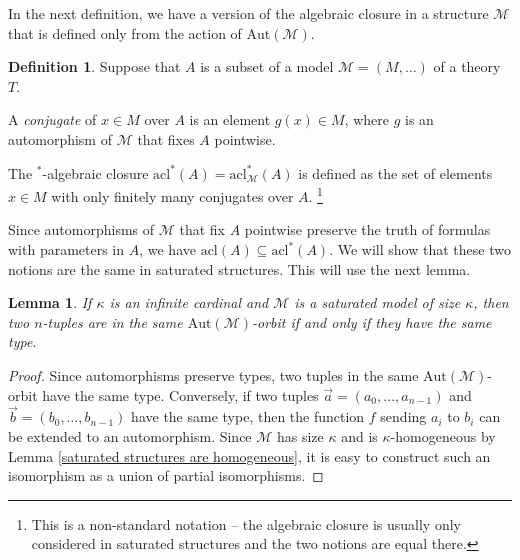 \documentclass[10pt]{amsart}
\newcommand{\MM}{\mathcal{M}}
\newcommand{\acl}{\mathrm{acl}}
\newcommand{\tp}{\mathrm{tp}}
\newcommand{\Aut}{\mathrm{Aut}}
\newtheorem{lemma}[theorem]{Lemma}
\theoremstyle{definition}
\newtheorem{definition}[theorem]{Definition}
\theoremstyle{remark}
\newenvironment{enumerate-(a)}{\begin{enumerate}[label={\upshape (\alph*)}, leftmargin=2pc]}{\end{enumerate}}
\begin{document}
In the next definition, we have a version of the algebraic closure in a structure $\MM$ that is defined only from the action of $\Aut(\MM)$. 

\begin{definition} 
Suppose that $A$ is a subset of a model $\MM=(M,\dots)$ of a theory $T$. 
\begin{enumerate-(a)} 
\item 
A \emph{conjugate} of $x\in M$ over $A$ is an element $g(x)\in M$, where $g$ is an automorphism of $\MM$ that fixes $A$ pointwise. 
\item 
The ${}^*$-algebraic closure $\acl^*(A)=\acl_{\MM}^*(A)$ is defined as the set of elements $x\in M$ with only finitely many conjugates over $A$. \footnote{This is a non-standard notation -- the algebraic closure is usually only considered in saturated structures and the two notions are equal there. }
\end{enumerate-(a)} 
\end{definition} 

Since automorphisms of $\MM$ that fix $A$ pointwise preserve the truth of formulas with parameters in $A$, we have $\acl(A)\subseteq\acl^*(A)$. We will show that these two notions are the same in saturated structures. This will use the next lemma. 


\begin{lemma} \label{orbits and types in saturated structures} 
If $\kappa$ is an infinite cardinal and $\MM$ is a saturated model of size $\kappa$, then two $n$-tuples are in the same $\Aut(\MM)$-orbit if and only if they have the same type. 
\end{lemma} 
\begin{proof} 
Since automorphisms preserve types, two tuples in the same $\Aut(\MM)$-orbit have the same type. Conversely, if two tuples $\vec{a}=(a_0,\dots,a_{n-1})$ and $\vec{b}=(b_0,\dots,b_{n-1})$ have the same type, then the function $f$ sending $a_i$ to $b_i$ can be extended to an automorphism. Since $\MM$ has size $\kappa$ and is $\kappa$-homogeneous by Lemma \ref{saturated structures are homogeneous}, it is easy to construct such an isomorphism as a union of partial isomorphisms. 
\end{proof} 
\end{document}
